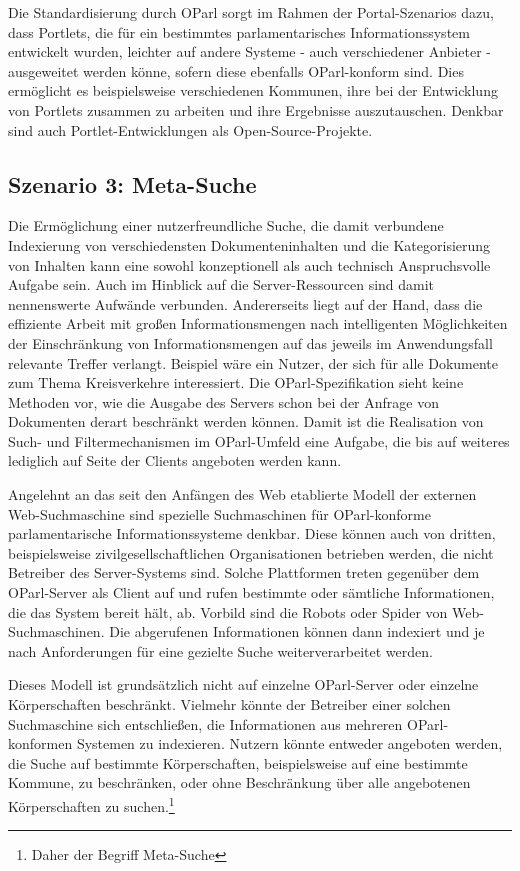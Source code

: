 \documentclass[,a4paper]{article}
\begin{document}
Die Standardisierung durch OParl sorgt im Rahmen der Portal-Szenarios
dazu, dass Portlets, die für ein bestimmtes parlamentarisches
Informationssystem entwickelt wurden, leichter auf andere Systeme - auch
verschiedener Anbieter - ausgeweitet werden könne, sofern diese
ebenfalls OParl-konform sind. Dies ermöglicht es beispielsweise
verschiedenen Kommunen, ihre bei der Entwicklung von Portlets zusammen
zu arbeiten und ihre Ergebnisse auszutauschen. Denkbar sind auch
Portlet-Entwicklungen als Open-Source-Projekte.

\subsection{Szenario 3: Meta-Suche}\label{szenarioux5fmetaux5fsuche}

Die Ermöglichung einer nutzerfreundliche Suche, die damit verbundene
Indexierung von verschiedensten Dokumenteninhalten und die
Kategorisierung von Inhalten kann eine sowohl konzeptionell als auch
technisch Anspruchsvolle Aufgabe sein. Auch im Hinblick auf die
Server-Ressourcen sind damit nennenswerte Aufwände verbunden.
Andererseits liegt auf der Hand, dass die effiziente Arbeit mit großen
Informationsmengen nach intelligenten Möglichkeiten der Einschränkung
von Informationsmengen auf das jeweils im Anwendungsfall relevante
Treffer verlangt. Beispiel wäre ein Nutzer, der sich für alle Dokumente
zum Thema Kreisverkehre interessiert. Die OParl-Spezifikation sieht
keine Methoden vor, wie die Ausgabe des Servers schon bei der Anfrage
von Dokumenten derart beschränkt werden können. Damit ist die
Realisation von Such- und Filtermechanismen im OParl-Umfeld eine
Aufgabe, die bis auf weiteres lediglich auf Seite der Clients angeboten
werden kann.

Angelehnt an das seit den Anfängen des Web etablierte Modell der
externen Web-Suchmaschine sind spezielle Suchmaschinen für
OParl-konforme parlamentarische Informationssysteme denkbar. Diese
können auch von dritten, beispielsweise zivilgesellschaftlichen
Organisationen betrieben werden, die nicht Betreiber des Server-Systems
sind. Solche Plattformen treten gegenüber dem OParl-Server als Client
auf und rufen bestimmte oder sämtliche Informationen, die das System
bereit hält, ab. Vorbild sind die Robots oder Spider von
Web-Suchmaschinen. Die abgerufenen Informationen können dann indexiert
und je nach Anforderungen für eine gezielte Suche weiterverarbeitet
werden.

Dieses Modell ist grundsätzlich nicht auf einzelne OParl-Server oder
einzelne Körperschaften beschränkt. Vielmehr könnte der Betreiber einer
solchen Suchmaschine sich entschließen, die Informationen aus mehreren
OParl-konformen Systemen zu indexieren. Nutzern könnte entweder
angeboten werden, die Suche auf bestimmte Körperschaften, beispielsweise
auf eine bestimmte Kommune, zu beschränken, oder ohne Beschränkung über
alle angebotenen Körperschaften zu suchen.\footnote{Daher der Begriff
  Meta-Suche}
\end{document}
